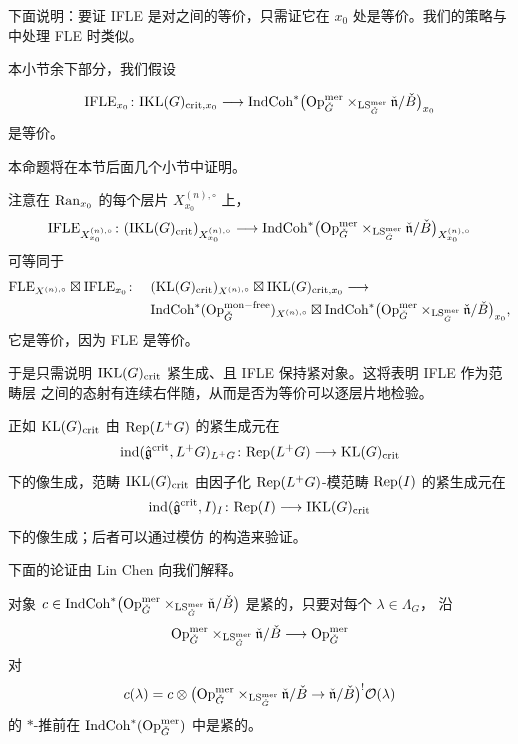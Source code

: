 下面说明：要证 IFLE 是对之间的等价，只需证它在 $x_0$ 处是等价。我们的策略与
\cite[第 6.2 节]{ABC+24a} 中处理 FLE 时类似。

本小节余下部分，我们假设

\begin{proposition}\label{prop:3.4.2.1}
\[
\mathrm{IFLE}_{x_0}\colon \mathrm{IKL}(G)_{\mathrm{crit},x_0}\longrightarrow
\mathrm{IndCoh}^{*}\bigl(\mathrm{Op}^{\mathrm{mer}}_{\check G}
\times_{\mathrm{LS}^{\mathrm{mer}}_{\check G}}\check{\mathfrak{n}}/\check B\bigr)_{x_0}
\]
是等价。
\end{proposition}

本命题将在本节后面几个小节中证明。

注意在 $\mathrm{Ran}_{x_0}$ 的每个层片 $X^{(n),\circ}_{x_0}$ 上，
\[
\mathrm{IFLE}_{X^{(n),\circ}_{x_0}}\colon
(\mathrm{IKL}(G)_{\mathrm{crit}})_{X^{(n),\circ}_{x_0}}\longrightarrow
\mathrm{IndCoh}^{*}\bigl(\mathrm{Op}^{\mathrm{mer}}_{\check G}
\times_{\mathrm{LS}^{\mathrm{mer}}_{\check G}}\check{\mathfrak{n}}/\check B\bigr)
_{X^{(n),\circ}_{x_0}}
\]
可等同于
\begin{align}
\mathrm{FLE}_{X^{(n),\circ}}\boxtimes \mathrm{IFLE}_{x_0}\colon\quad
&(\mathrm{KL}(G)_{\mathrm{crit}})_{X^{(n),\circ}}\boxtimes \mathrm{IKL}(G)_{\mathrm{crit},x_0}
\longrightarrow\label{eq:3.4.3}\\
&\mathrm{IndCoh}^{*}(\mathrm{Op}^{\mathrm{mon-free}}_{\check G})_{X^{(n),\circ}}
\boxtimes \mathrm{IndCoh}^{*}\bigl(\mathrm{Op}^{\mathrm{mer}}_{\check G}
\times_{\mathrm{LS}^{\mathrm{mer}}_{\check G}}\check{\mathfrak{n}}/\check B\bigr)_{x_0},
\label{eq:3.4.4}
\end{align}
它是等价，因为 FLE 是等价。

于是只需说明 $\mathrm{IKL}(G)_{\mathrm{crit}}$ 紧生成、且 IFLE 保持紧对象。这将表明 IFLE 作为范畴层
之间的态射有连续右伴随，从而是否为等价可以逐层片地检验。

正如 $\mathrm{KL}(G)_{\mathrm{crit}}$ 由 $\mathrm{Rep}(L^+G)$ 的紧生成元在
\[
\mathrm{ind}(\hat{\mathfrak{g}}^{\mathrm{crit}},L^+G)_{L^+G}\colon
\mathrm{Rep}(L^+G)\longrightarrow \mathrm{KL}(G)_{\mathrm{crit}}
\]
下的像生成，范畴 $\mathrm{IKL}(G)_{\mathrm{crit}}$ 由因子化 $\mathrm{Rep}(L^+G)$-模范畴 $\mathrm{Rep}(I)$ 的紧生成元在
\[
\mathrm{ind}(\hat{\mathfrak{g}}^{\mathrm{crit}},I)_{I}\colon
\mathrm{Rep}(I)\longrightarrow \mathrm{IKL}(G)_{\mathrm{crit}}
\]
下的像生成；后者可以通过模仿 \cite[附录 B.14]{ABC+24a} 的构造来验证。

\begin{remark}\label{rem:3.4.2.2}
下面的论证由 Lin Chen 向我们解释。
\end{remark}

\begin{lemma}\label{lem:3.4.2.3}
对象 $c\in \mathrm{IndCoh}^{*}\bigl(\mathrm{Op}^{\mathrm{mer}}_{\check G}
\times_{\mathrm{LS}^{\mathrm{mer}}_{\check G}}\check{\mathfrak{n}}/\check B\bigr)$
是紧的，只要对每个 $\lambda\in \Lambda_G$，
沿
\[
\mathrm{Op}^{\mathrm{mer}}_{\check G}\times_{\mathrm{LS}^{\mathrm{mer}}_{\check G}}\check{\mathfrak{n}}/\check B
\longrightarrow \mathrm{Op}^{\mathrm{mer}}_{\check G}
\]
对
\[
c(\lambda)=c\otimes
\bigl(\mathrm{Op}^{\mathrm{mer}}_{\check G}\times_{\mathrm{LS}^{\mathrm{mer}}_{\check G}}
\check{\mathfrak{n}}/\check B\to \check{\mathfrak{n}}/\check B\bigr)^{!}\mathcal{O}(\lambda)
\]
的 $*$-推前在 $\mathrm{IndCoh}^{*}(\mathrm{Op}^{\mathrm{mer}}_{\check G})$ 中是紧的。
\end{lemma}

